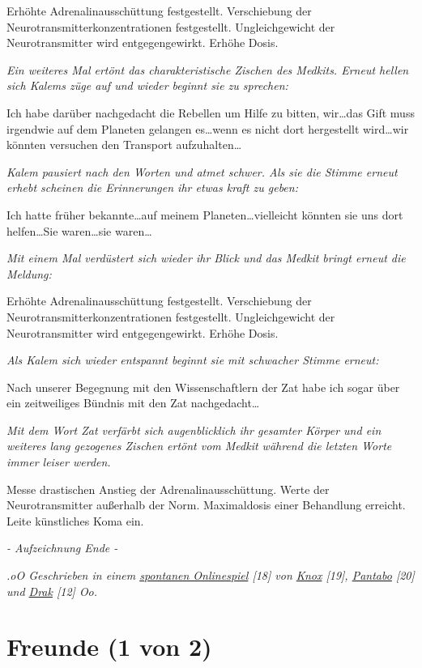\documentclass[11pt]{article}
\begin{document}
Erhöhte Adrenalinausschüttung festgestellt. Verschiebung der
Neurotransmitterkonzentrationen festgestellt. Ungleichgewicht der
Neurotransmitter wird entgegengewirkt. Erhöhe Dosis.

\emph{Ein weiteres Mal ertönt das charakteristische Zischen des Medkits.
Erneut hellen sich Kalems züge auf und wieder beginnt sie zu sprechen:}

Ich habe darüber nachgedacht die Rebellen um Hilfe zu bitten,
wir\ldots{}das Gift muss irgendwie auf dem Planeten gelangen
es\ldots{}wenn es nicht dort hergestellt wird\ldots{}wir könnten
versuchen den Transport aufzuhalten\ldots{}

\emph{Kalem pausiert nach den Worten und atmet schwer. Als sie die
Stimme erneut erhebt scheinen die Erinnerungen ihr etwas kraft zu
geben:}

Ich hatte früher bekannte\ldots{}auf meinem Planeten\ldots{}vielleicht
könnten sie uns dort helfen\ldots{}Sie waren\ldots{}sie waren\ldots{}

\emph{Mit einem Mal verdüstert sich wieder ihr Blick und das Medkit
bringt erneut die Meldung:}

Erhöhte Adrenalinausschüttung festgestellt. Verschiebung der
Neurotransmitterkonzentrationen festgestellt. Ungleichgewicht der
Neurotransmitter wird entgegengewirkt. Erhöhe Dosis.

\emph{Als Kalem sich wieder entspannt beginnt sie mit schwacher Stimme
erneut:}

Nach unserer Begegnung mit den Wissenschaftlern der Zat habe ich sogar
über ein zeitweiliges Bündnis mit den Zat nachgedacht\ldots{}

\emph{Mit dem Wort Zat verfärbt sich augenblicklich ihr gesamter Körper
und ein weiteres lang gezogenes Zischen ertönt vom Medkit während die
letzten Worte immer leiser werden.}

Messe drastischen Anstieg der Adrenalinausschüttung. Werte der
Neurotransmitter außerhalb der Norm. Maximaldosis einer Behandlung
erreicht. Leite künstliches Koma ein.

\emph{- Aufzeichnung Ende -}

\emph{.oO Geschrieben in einem \href{}{spontanen Onlinespiel} {[}18{]}
von \href{http://1w6.org/uzanto/knox}{Knox} {[}19{]},
\href{http://1w6.org/uzanto/pantabo}{Pantabo} {[}20{]} und
\href{http://1w6.org/uzanto/drak}{Drak} {[}12{]} Oo.}

\section{Freunde (1 von 2)}
\end{document}
